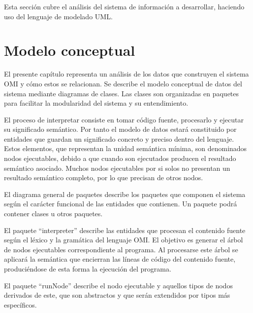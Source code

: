 

Esta sección cubre el análisis del sistema de información a desarrollar, haciendo uso del lenguaje de modelado UML.

\section{Modelo conceptual}
El presente capítulo representa un análisis de los datos que construyen
el sistema OMI y cómo estos se relacionan. Se describe el 
modelo conceptual de datos del sistema mediante diagramas de clases. Las 
clases son organizadas en paquetes para facilitar la modularidad del sistema
y su entendimiento. 

El proceso de interpretar consiste en tomar código fuente, procesarlo y ejecutar 
su significado semántico. Por tanto el modelo de datos estará constituido por
entidades que guardan un significado concreto y preciso dentro del lenguaje.
Estos elementos, que representan la unidad semántica mínima, 
son denominados nodos ejecutables, debido a que cuando 
son ejecutados producen el resultado semántico asociado.  Muchos nodos ejecutables
por si solos no presentan un resultado semántico completo, por lo que precisan de otros
nodos. 

El diagrama general de paquetes describe los paquetes que componen el 
sistema según el carácter funcional de las entidades que contienen. Un 
paquete podrá contener clases u otros paquetes.

El paquete ``interpreter'' describe las entidades que procesan  
el contenido fuente según el léxico y la gramática del lenguaje OMI. 
El objetivo es generar el árbol de nodos ejecutables correspondiente al
programa. Al procesarse este árbol se aplicará la semántica que encierran 
las líneas de código del contenido fuente, produciéndose de esta forma la ejecución del programa.

El paquete ``runNode'' describe el nodo ejecutable y aquellos tipos de nodos derivados
de este, que son abstractos y que serán extendidos por tipos más específicos.

